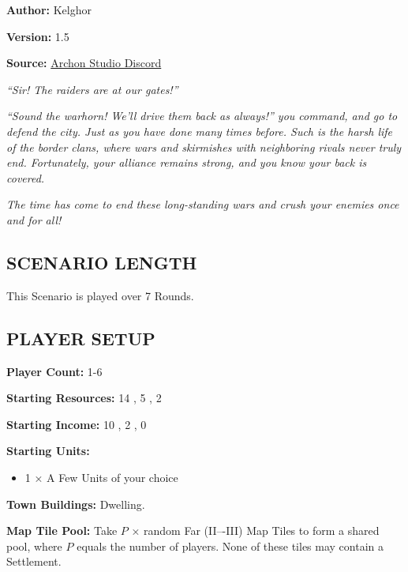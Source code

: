 
\begin{multicols}{2}

\textbf{Author:} Kelghor

\textbf{Version:} 1.5

\textbf{Source:} \href{https://discord.com/channels/740870068178649108/1313651865648369725}{Archon Studio Discord}

\textit{``Sir! The raiders are at our gates!''}

\textit{``Sound the warhorn! We'll drive them back as always!'' you command, and go to defend the city. Just as you have done many times before. Such is the harsh life of the border clans, where wars and skirmishes with neighboring rivals never truly end. Fortunately, your alliance remains strong, and you know your back is covered.}

\textit{The time has come to end these long-standing wars and crush your enemies once and for all!}

\subsection*{\MakeUppercase{Scenario Length}}

This Scenario is played over 7 Rounds.

\subsection*{\MakeUppercase{Player Setup}}

\textbf{Player Count:} 1-6

\textbf{Starting Resources:} 14 , 5 , 2 

\textbf{Starting Income:} 10 , 2 , 0 

\textbf{Starting Units:}
\begin{itemize}
  \item  1 × A Few  Units of your choice
\end{itemize}

\textbf{Town Buildings:}  Dwelling.

\textbf{Map Tile Pool:} Take $P$ × random Far (II–-III) Map Tiles to form a shared pool, where $P$ equals the number of players. None of these tiles may contain a Settlement.


\end{multicols}
